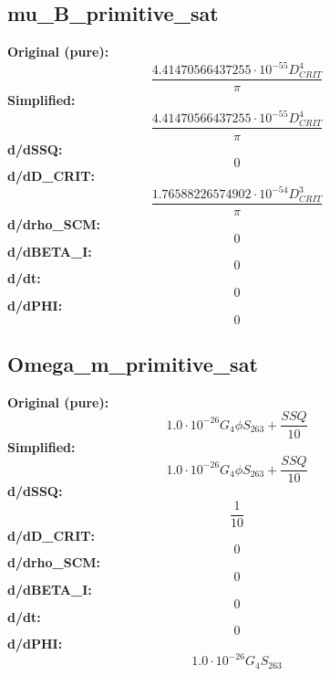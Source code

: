 \subsection{mu_B_primitive_sat}
\textbf{Original (pure):}
\begin{equation}
\frac{4.41470566437255 \cdot 10^{-55} D_{CRIT}^{4}}{\pi}
\end{equation}
\textbf{Simplified:}
\begin{equation}
\frac{4.41470566437255 \cdot 10^{-55} D_{CRIT}^{4}}{\pi}
\end{equation}
\textbf{d/dSSQ:}
\begin{equation}
0
\end{equation}
\textbf{d/dD_CRIT:}
\begin{equation}
\frac{1.76588226574902 \cdot 10^{-54} D_{CRIT}^{3}}{\pi}
\end{equation}
\textbf{d/drho_SCM:}
\begin{equation}
0
\end{equation}
\textbf{d/dBETA_I:}
\begin{equation}
0
\end{equation}
\textbf{d/dt:}
\begin{equation}
0
\end{equation}
\textbf{d/dPHI:}
\begin{equation}
0
\end{equation}

\subsection{Omega_m_primitive_sat}
\textbf{Original (pure):}
\begin{equation}
1.0 \cdot 10^{-26} G_{4} \phi S_{26 3} + \frac{SSQ}{10}
\end{equation}
\textbf{Simplified:}
\begin{equation}
1.0 \cdot 10^{-26} G_{4} \phi S_{26 3} + \frac{SSQ}{10}
\end{equation}
\textbf{d/dSSQ:}
\begin{equation}
\frac{1}{10}
\end{equation}
\textbf{d/dD_CRIT:}
\begin{equation}
0
\end{equation}
\textbf{d/drho_SCM:}
\begin{equation}
0
\end{equation}
\textbf{d/dBETA_I:}
\begin{equation}
0
\end{equation}
\textbf{d/dt:}
\begin{equation}
0
\end{equation}
\textbf{d/dPHI:}
\begin{equation}
1.0 \cdot 10^{-26} G_{4} S_{26 3}
\end{equation}


